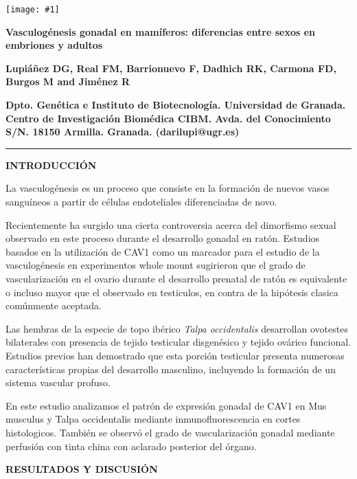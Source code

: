 \documentclass[a0,portrait]{a0poster}
\newcommand{\apartado}[1]{\noindent\fontsize{45pt}{45pt}\selectfont\textcolor[rgb]{0,0,1}{\textbf{\uppercase{#1}}}}
\newcommand{\texto}[1]{\fontsize{30pt}{30pt}\selectfont #1}
\newcommand{\titulo}[4]%
{
 \begin{minipage}[c]{10cm}
 \texttt{[image: \#1]}
 \end{minipage}
 \hfill
 \begin{minipage}[c]{65cm}
 \fontsize{2.2cm}{2.6cm}\selectfont 
 \centering \textbf{\textcolor[rgb]{.5,0,0}{#2}}
 
 \vspace{.5cm}

 \begin{center}
 \fontsize{1.8cm}{1.8cm}\selectfont
 \textbf{\textcolor[rgb]{0,0,.5}{#3}}

 \vspace{.5cm}
 \fontsize{1.8cm}{1.8cm}\selectfont
 \textbf{\textcolor[rgb]{0,.5,0}{#4}}
 \end{center}
 \end{minipage}

 \vspace{1cm}
 
 \rule{\textwidth}{.2cm}
}
\begin{document}

\titulo{esc-ugr}{Vasculogénesis gonadal en mamíferos: diferencias entre sexos en embriones y adultos}{Lupiáñez DG, Real FM, Barrionuevo F, Dadhich RK, Carmona FD, Burgos M and Jiménez R}{Dpto. Genética e Instituto de Biotecnología. Universidad de Granada. Centro de Investigación Biomédica CIBM. Avda. del Conocimiento S/N. 18150 Armilla. Granada. (darilupi@ugr.es)}

\begin{multicols*}{2}

\apartado{Introducción}

\texto{
La vasculogénesis es un proceso que consiste en la formación de nuevos vasos sanguíneos a partir de células endoteliales diferenciadas de novo. 

Recientemente ha surgido una cierta controversia acerca del dimorfismo sexual observado en este proceso durante el desarrollo gonadal en ratón. Estudios basados en la utilización de CAV1 como un marcador para el estudio de la vasculogénesis en experimentos whole mount sugirieron que el grado de vascularización en el ovario durante el desarrollo prenatal de ratón es equivalente o incluso mayor que el observado en testiculos, en contra de la hipótesis clasica comúnmente aceptada. 

Las hembras de la especie de topo ibérico \emph{Talpa occidentalis} desarrollan ovotestes bilaterales con presencia de tejido testicular disgenésico y tejido ovárico funcional. Estudios previos han demostrado que esta porción testicular presenta numerosas características propias del desarrollo masculino, incluyendo la formación de un sistema vascular profuso.

En este estudio analizamos el patrón de expresión gonadal de CAV1 en Mus musculus y Talpa occidentalis mediante inmunofluorescencia en cortes histologicos. También se observó el grado de vascularización gonadal mediante perfusión con tinta china con aclarado posterior del órgano.


}









\apartado{Resultados y Discusión}

\texto{

}


\end{multicols*}
\end{document}
